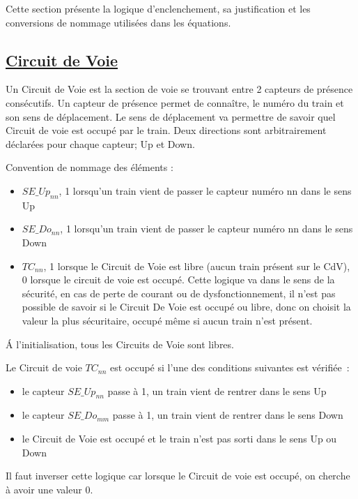 Cette section présente la logique d'enclenchement, sa justification et
les conversions de nommage utilisées dans les équations.

\subsection{\underline{Circuit de Voie}}
\label{sec:CdV}

Un Circuit de Voie est la section de voie se trouvant entre 2 capteurs
de présence consécutifs. Un capteur de présence permet de
connaître, le numéro du train et son sens de déplacement. Le sens de
déplacement va permettre de savoir quel Circuit de voie est occupé par le
train. Deux directions sont arbitrairement déclarées pour chaque
capteur; Up et Down.

Convention de nommage des éléments :
\begin{itemize}
\item $SE\_Up_{nn}$, 1 lorsqu'un train vient de passer le capteur numéro
  nn dans le sens Up
\item $SE\_Do_{nn}$, 1 lorsqu'un train vient de passer le capteur numéro
  nn dans le sens Down
\item $TC_{nn}$, 1 lorsque le Circuit de Voie est libre (aucun train
  présent sur le CdV), 0 lorsque le circuit de voie est occupé. Cette
  logique va dans le sens de la sécurité, en cas de perte de courant
  ou de dysfonctionnement, il n'est pas possible de savoir si le
  Circuit De Voie est occupé ou libre, donc on choisit la valeur la
  plus sécuritaire, occupé même si aucun train n'est présent.
\end{itemize}

\'A l'initialisation, tous les Circuits de Voie sont libres.

\medskip
Le Circuit de voie $TC_{nn}$ est occupé si l'une des conditions suivantes
est vérifiée~:
\begin{itemize}
\item le capteur $SE\_Up_{nn}$ passe à 1, un train vient de rentrer dans
  le sens Up
\item le capteur $SE\_Do_{mm}$ passe à 1, un train vient de rentrer dans
  le sens Down
\item le Circuit de Voie est occupé et le train n'est pas sorti dans
  le sens Up ou Down
\end{itemize}

Il faut inverser cette logique car lorsque le Circuit de voie est
occupé, on cherche à avoir une valeur 0.

